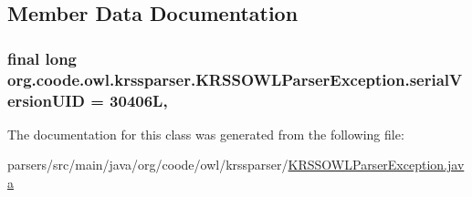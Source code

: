 \subsection{Member Data Documentation}
\hypertarget{classorg_1_1coode_1_1owl_1_1krssparser_1_1_k_r_s_s_o_w_l_parser_exception_ab9f4a9a86192fee52fda60e7b1e70642}{
\subsubsection[{serial\-Version\-U\-I\-D}]{\setlength{\rightskip}{0pt plus 5cm}final long org.\-coode.\-owl.\-krssparser.\-K\-R\-S\-S\-O\-W\-L\-Parser\-Exception.\-serial\-Version\-U\-I\-D = 30406\-L\hspace{0.3cm}{\ttfamily [static]}, {\ttfamily [private]}}}\label{classorg_1_1coode_1_1owl_1_1krssparser_1_1_k_r_s_s_o_w_l_parser_exception_ab9f4a9a86192fee52fda60e7b1e70642}


The documentation for this class was generated from the following file\-:\begin{DoxyCompactItemize}
\item 
parsers/src/main/java/org/coode/owl/krssparser/\hyperlink{_k_r_s_s_o_w_l_parser_exception_8java}{K\-R\-S\-S\-O\-W\-L\-Parser\-Exception.\-java}\end{DoxyCompactItemize}
